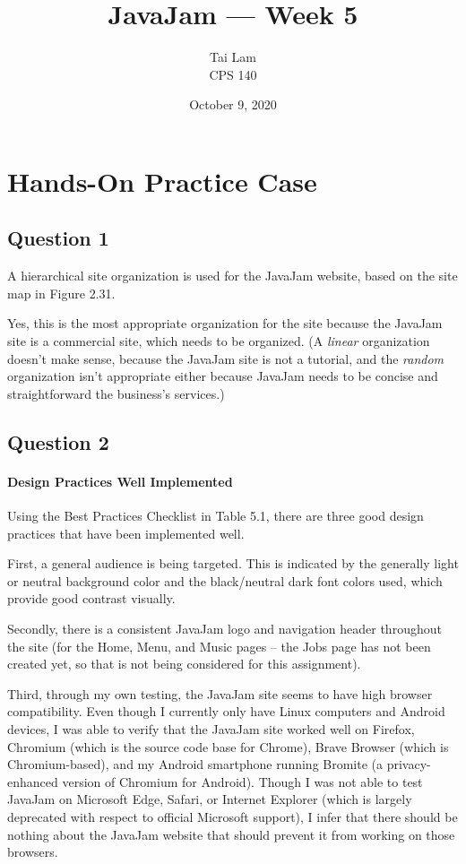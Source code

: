 \documentclass[12pt,letterpaper]{article}
\title{JavaJam --- Week 5}
\date{October 9, 2020}
\author{Tai Lam \\ CPS 140}
\begin{document}
    
    \maketitle
    
    \section{Hands-On Practice Case}
    \subsection{Question 1}
    A hierarchical site organization is used for the JavaJam website, based on the site map in Figure 2.31.
    
    Yes, this is the most appropriate organization for the site because the JavaJam site is a commercial site, which needs to be organized.  (A \emph{linear} organization doesn't make sense, because the JavaJam site is not a tutorial, and the \emph{random} organization isn't appropriate either because JavaJam needs to be concise and straightforward the business's services.)
    
    \subsection{Question 2}
    \paragraph{Design Practices Well Implemented} Using the Best Practices Checklist in Table 5.1, there are three good design practices that have been implemented well.
    
    First, a general audience is being targeted.  This is indicated by the generally light or neutral background color and the black/neutral dark font colors used, which provide good contrast visually.
    
    Secondly, there is a consistent JavaJam logo and navigation header throughout the site (for the Home, Menu, and Music pages -- the Jobs page has not been created yet, so that is not being considered for this assignment).
    
    Third, through my own testing, the JavaJam site seems to have high browser compatibility.  Even though I currently only have Linux computers and Android devices, I was able to verify that the JavaJam site worked well on Firefox, Chromium (which is the source code base for Chrome),  Brave Browser (which is Chromium-based), and my Android smartphone running Bromite (a privacy-enhanced version of Chromium for Android).  Though I was not able to test JavaJam on Microsoft Edge, Safari, or Internet Explorer (which is largely deprecated with respect to official Microsoft support), I infer that there should be nothing about the JavaJam website that should prevent it from working on those browsers.
    
\end{document}
